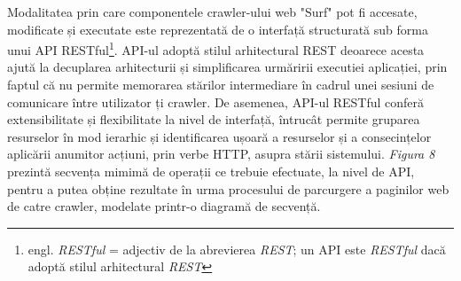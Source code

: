 Modalitatea prin care componentele crawler-ului web "Surf" pot fi accesate, modificate și executate este reprezentată de o interfață\cite{iterface-definition} structurată sub forma unui API RESTful\footnote{engl. \textit{RESTful} = adjectiv de la abrevierea \textit{REST}; un API este \textit{RESTful} dacă adoptă stilul arhitectural \textit{REST\cite{rest-definition}}}. API-ul adoptă stilul arhitectural REST\cite{rest-definition} deoarece acesta ajută la decuplarea arhitecturii și simplificarea urmăririi executiei aplicației, prin faptul că nu permite memorarea stărilor intermediare în cadrul unei sesiuni de comunicare între utilizator ți crawler. De asemenea, API-ul RESTful conferă extensibilitate și flexibilitate la nivel de interfață, întrucât permite gruparea resurselor în mod ierarhic și identificarea ușoară a resurselor și a consecințelor aplicării anumitor acțiuni, prin verbe HTTP, asupra stării sistemului. \textit{Figura 8} prezintă secvența mimimă de operații ce trebuie efectuate, la nivel de API, pentru a putea obține rezultate în urma procesului de parcurgere a paginilor web de catre crawler, modelate printr-o diagramă de secvență.

